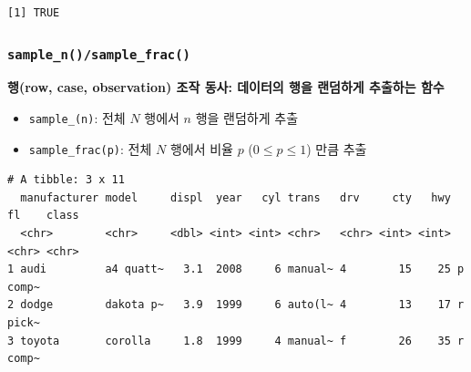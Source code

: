 \documentclass[
  11pt,
]{krantz}
\makeatletter
\newenvironment{Shaded}{\begin{snugshade}}{\end{snugshade}}
\newcommand{\CommentTok}[1]{\textcolor[rgb]{0.37,0.37,0.37}{\textit{#1}}}
\newcommand{\DecValTok}[1]{\textcolor[rgb]{0.06,0.06,0.06}{#1}}
\newcommand{\KeywordTok}[1]{\textcolor[rgb]{0.27,0.27,0.27}{\textbf{#1}}}
\newcommand{\NormalTok}[1]{#1}
\newcommand{\OperatorTok}[1]{\textcolor[rgb]{0.43,0.43,0.43}{\textbf{#1}}}
\newcommand{\StringTok}[1]{\textcolor[rgb]{0.5,0.5,0.5}{#1}}
\providecommand{\tightlist}{%
  \setlength{\itemsep}{0pt}\setlength{\parskip}{0pt}}
\newenvironment{kframe}{%
\medskip{}
\setlength{\fboxsep}{.8em}
 \def\at@end@of@kframe{}%
 \ifinner\ifhmode%
  \def\at@end@of@kframe{\end{minipage}}%
  \begin{minipage}{\columnwidth}%
 \fi\fi%
 \def\FrameCommand##1{\hskip\@totalleftmargin \hskip-\fboxsep
 \colorbox{shadecolor}{##1}\hskip-\fboxsep
     \hskip-\linewidth \hskip-\@totalleftmargin \hskip\columnwidth}%
 \MakeFramed {\advance\hsize-\width
   \@totalleftmargin\z@ \linewidth\hsize
   \@setminipage}}%
 {\par\unskip\endMakeFramed%
 \at@end@of@kframe}
\renewenvironment{quote}{\begin{kframe}}{\end{kframe}}
\makeatother
\begin{document}
\begin{Shaded}
\end{Shaded}

\begin{verbatim}
[1] TRUE
\end{verbatim}

\normalsize

\hypertarget{dplyr-sample}{%
\subsubsection*{\texorpdfstring{\texttt{sample\_n()/sample\_frac()}}{sample\_n()/sample\_frac()}}\label{dplyr-sample}}


\begin{quote}
\textbf{행(row, case, observation) 조작 동사: 데이터의 행을 랜덤하게 추출하는 함수}
\end{quote}

\begin{itemize}
\tightlist
\item
  \texttt{sample\_(n)}: 전체 \(N\) 행에서 \(n\) 행을 랜덤하게 추출
\item
  \texttt{sample\_frac(p)}: 전체 \(N\) 행에서 비율 \(p\) (\(0\leq p \leq1\)) 만큼 추출
\end{itemize}

\footnotesize

\begin{Shaded}
\end{Shaded}

\begin{verbatim}
# A tibble: 3 x 11
  manufacturer model     displ  year   cyl trans   drv     cty   hwy fl    class
  <chr>        <chr>     <dbl> <int> <int> <chr>   <chr> <int> <int> <chr> <chr>
1 audi         a4 quatt~   3.1  2008     6 manual~ 4        15    25 p     comp~
2 dodge        dakota p~   3.9  1999     6 auto(l~ 4        13    17 r     pick~
3 toyota       corolla     1.8  1999     4 manual~ f        26    35 r     comp~
\end{verbatim}
\end{document}
